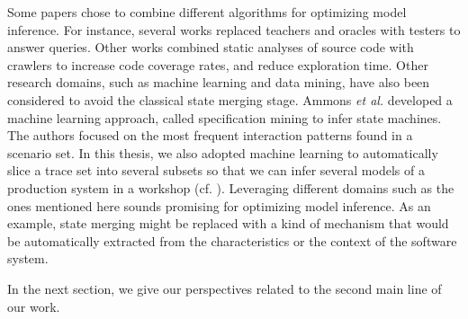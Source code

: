Some papers chose to combine different algorithms for optimizing
model inference. For instance, several works
\cite{Alur:2005:SIS:1047659.1040314,Raffelt:2005:LLA:1081180.1081189,ngll11}
replaced teachers and oracles with testers to answer queries.
Other works \cite{Azim13,WPX13} combined static analyses of
source code with crawlers to increase code coverage rates, and
reduce exploration time. Other  research domains, such as machine
learning and data mining, have also been considered to avoid the
classical state merging stage. Ammons \emph{et al.}
\cite{Ammons:2002:MS:565816.503275} developed a machine learning
approach, called specification mining to infer state machines.
The authors focused on the most frequent interaction patterns
found in a scenario set. In this thesis, we also adopted machine
learning to automatically slice a trace set into several subsets
so that we can infer several models of a production system in a
workshop (cf.
).
Leveraging different domains such as the ones mentioned here
sounds promising for optimizing model inference. As an example,
state merging might be replaced with a kind of mechanism that
would be automatically extracted from the characteristics or the
context of the software system.

In the next section, we give our perspectives related to the
second main line of our work.
